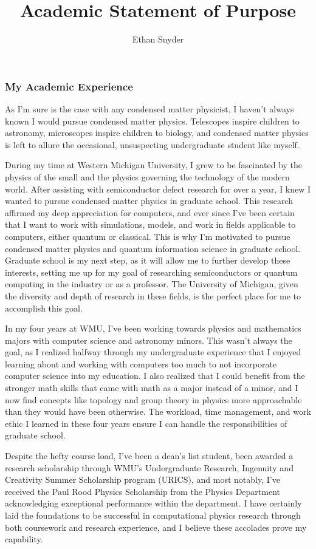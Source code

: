 \documentclass[11pt]{article}
\title{\vspace{-5em}Academic Statement of Purpose\\
	\large \dept{}}
\author{Ethan Snyder}
\date{}
\newcommand{\school}{University of Michigan}
\begin{document}
\maketitle
\subsubsection*{My Academic Experience}
As I'm sure is the case with any condensed matter physicist, I haven't always known I would pursue condensed matter physics. Telescopes inspire children to astronomy, microscopes inspire children to biology, and condensed matter physics is left to allure the occasional, unsuspecting undergraduate student like myself.

During my time at Western Michigan University, I grew to be fascinated by the physics of the small and the physics governing the technology of the modern world. After assisting with semiconductor defect research for over a year, I knew I wanted to pursue condensed matter physics in graduate school. This research affirmed my deep appreciation for computers, and ever since I've been certain that I want to work with simulations, models, and work in fields applicable to computers, either quantum or classical. This is why I'm motivated to pursue condensed matter physics and quantum information science in graduate school. Graduate school is my next step, as it will allow me to further develop these interests, setting me up for my goal of researching semiconductors or quantum computing in the industry or as a professor. The \school{}, given the diversity and depth of research in these fields, is the perfect place for me to accomplish this goal.

In my four years at WMU, I've been working towards physics and mathematics majors with computer science and astronomy minors. This wasn't always the goal, as I realized halfway through my undergraduate experience that I enjoyed learning about and working with computers too much to not incorporate computer science into my education. I also realized that I could benefit from the stronger math skills that came with math as a major instead of a minor, and I now find concepts like topology and group theory in physics more approachable than they would have been otherwise. The workload, time management, and work ethic I learned in these four years ensure I can handle the responsibilities of graduate school.

Despite the hefty course load, I've been a dean's list student, been awarded a research scholarship through WMU's Undergraduate Research, Ingenuity and Creativity Summer Scholarship program (URICS), and most notably, I've received the Paul Rood Physics Scholarship from the Physics Department acknowledging exceptional performance within the department. I have certainly laid the foundations to be successful in computational physics research through both coursework and research experience, and I believe these accolades prove my capability.
\end{document}
